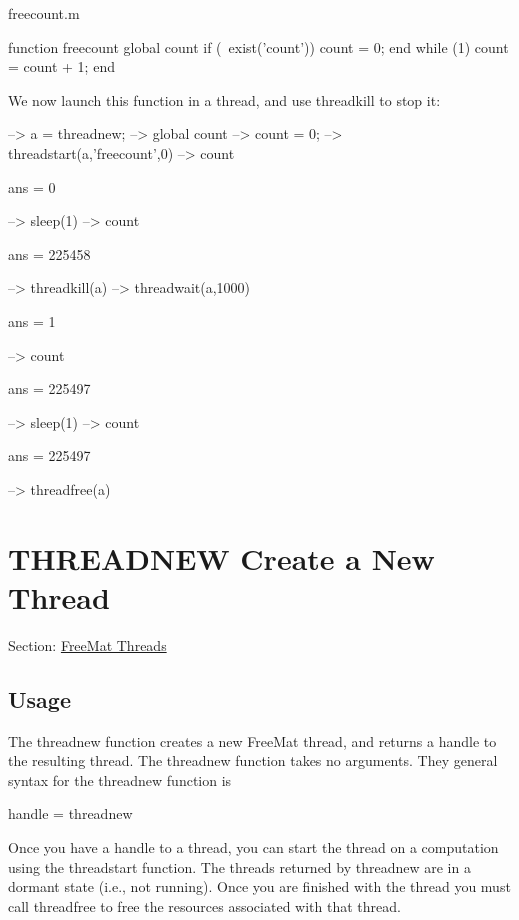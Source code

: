 \begin{DoxyVerb}     freecount.m
\end{DoxyVerb}



\begin{DoxyVerbInclude}
function freecount
  global count
  if (~exist('count')) count = 0; end  %
  while (1)
    count = count + 1;                 %
  end
\end{DoxyVerbInclude}


We now launch this function in a thread, and use {\ttfamily threadkill} to stop it\-:


\begin{DoxyVerbInclude}
--> a = threadnew;
--> global count                   %
--> count = 0;
--> threadstart(a,'freecount',0)   %
--> count                          %

ans = 
 0 

--> sleep(1)                       %
--> count                          %

ans = 
 225458 

--> threadkill(a)                  %
--> threadwait(a,1000)             %

ans = 
 1 

--> count                          %

ans = 
 225497 

--> sleep(1)
--> count

ans = 
 225497 

--> threadfree(a)
\end{DoxyVerbInclude}
 \hypertarget{thread_threadnew}{}\section{T\-H\-R\-E\-A\-D\-N\-E\-W Create a New Thread}\label{thread_threadnew}
Section\-: \hyperlink{sec_thread}{Free\-Mat Threads} \hypertarget{vtkwidgets_vtkxyplotwidget_Usage}{}\subsection{Usage}\label{vtkwidgets_vtkxyplotwidget_Usage}
The {\ttfamily threadnew} function creates a new Free\-Mat thread, and returns a handle to the resulting thread. The {\ttfamily threadnew} function takes no arguments. They general syntax for the {\ttfamily threadnew} function is \begin{DoxyVerb}   handle = threadnew
\end{DoxyVerb}
 Once you have a handle to a thread, you can start the thread on a computation using the {\ttfamily threadstart} function. The threads returned by {\ttfamily threadnew} are in a dormant state (i.\-e., not running). Once you are finished with the thread you must call {\ttfamily threadfree} to free the resources associated with that thread.

